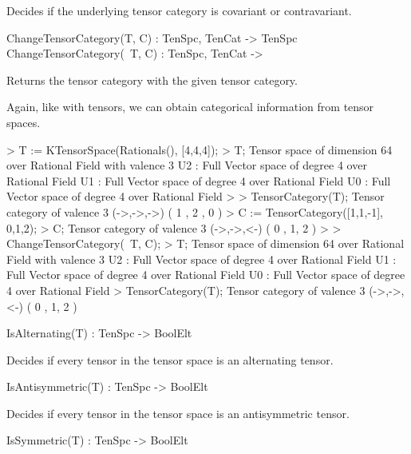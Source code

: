 Decides if the underlying tensor category is covariant or contravariant.

\begin{intrinsics}
ChangeTensorCategory(T, C) : TenSpc, TenCat -> TenSpc
ChangeTensorCategory(~T, C) : TenSpc, TenCat -> 
\end{intrinsics}

Returns the tensor category with the given tensor category.

\begin{example}[TenSpcCategories]

Again, like with tensors, we can obtain categorical information from tensor spaces.
\begin{code}
> T := KTensorSpace(Rationals(), [4,4,4]);
> T;
Tensor space of dimension 64 over Rational Field with valence 3
U2 : Full Vector space of degree 4 over Rational Field
U1 : Full Vector space of degree 4 over Rational Field
U0 : Full Vector space of degree 4 over Rational Field
> 
> TensorCategory(T);
Tensor category of valence 3 (->,->,->) ({ 1 },{ 2 },{ 0 })
> C := TensorCategory([1,1,-1], {{0},{1,2}});
> C;
Tensor category of valence 3 (->,->,<-) ({ 0 },{ 1, 2 })
> 
> ChangeTensorCategory(~T, C);
> T;
Tensor space of dimension 64 over Rational Field with valence 3
U2 : Full Vector space of degree 4 over Rational Field
U1 : Full Vector space of degree 4 over Rational Field
U0 : Full Vector space of degree 4 over Rational Field
> TensorCategory(T);
Tensor category of valence 3 (->,->,<-) ({ 0 },{ 1, 2 })
\end{code}
\end{example}


\begin{intrinsics}
IsAlternating(T) : TenSpc -> BoolElt
\end{intrinsics}

Decides if every tensor in the tensor space is an alternating tensor.

\begin{intrinsics}
IsAntisymmetric(T) : TenSpc -> BoolElt
\end{intrinsics}

Decides if every tensor in the tensor space is an antisymmetric tensor.

\begin{intrinsics}
IsSymmetric(T) : TenSpc -> BoolElt
\end{intrinsics}

